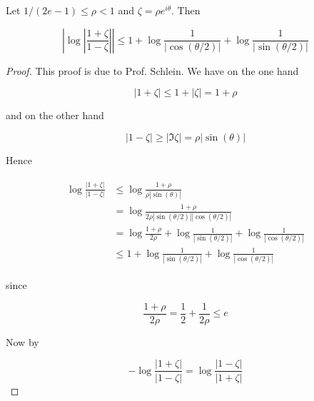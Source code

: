\begin{lemma}
	Let $1/(2e - 1) \leq \rho < 1$ and $\zeta = \rho e^{i\theta}$. Then

	\begin{equation*}
		\left| \log \left| \frac{1 + \zeta}{1 - \zeta} \right| \right| \leq 1 + \log \frac{1}{\left| \cos(\theta/2) \right|} + \log \frac{1}{\left| \sin(\theta/2) \right|}
	\end{equation*}
	\label{lem:upper_bound}
\end{lemma}

\begin{proof}
	This proof is due to Prof. Schlein. We have on the one hand

	\begin{equation*}
		\left| 1 + \zeta \right| \leq 1 + \left| \zeta \right| = 1 + \rho
	\end{equation*}

	and on the other hand

	\begin{equation*}
		\left| 1 - \zeta \right| \geq \left|\Im\zeta \right| = \rho\left|\sin(\theta)\right|
	\end{equation*}

	Hence
	
	\begin{gather*}
		\begin{aligned}
			\log \frac{\left| 1 + \zeta \right|}{\left| 1 - \zeta \right|} &\leq \log\frac{1 + \rho}{\rho \left| \sin(\theta)\right|}\\
			&=  \log\frac{1 + \rho}{2\rho \left| \sin(\theta/2)\right|\left| \cos(\theta/2)\right|}\\
			&=  \log\frac{1 + \rho}{2\rho}  +  \log \frac{1}{\left| \sin(\theta/2)\right|} +  \log\frac{1}{\left| \cos(\theta/2)\right|}\\
			&\leq  1 + \log \frac{1}{\left| \sin(\theta/2)\right|} + \log \frac{1}{\left| \cos(\theta/2)\right|}	
		\end{aligned}
	\end{gather*}

	since

	\begin{equation*}
		\frac{1 + \rho}{2\rho} = \frac{1}{2} + \frac{1}{2\rho} \leq e
	\end{equation*}

	Now by

	\begin{equation*}
		-\log \frac{\left| 1 + \zeta \right|}{\left| 1 - \zeta \right|}  = 	\log \frac{\left| 1 - \zeta \right|}{\left| 1 + \zeta \right|} 
	\end{equation*}


\end{proof}
